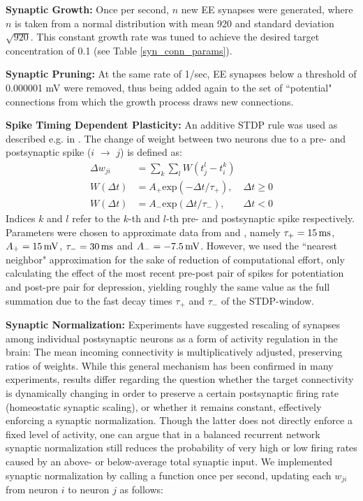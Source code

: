 \documentclass[10pt,a4paper]{article}
\begin{document}
\textbf{Synaptic Growth:} Once per second, $n$ new EE synapses were generated, where $n$ is taken from a normal distribution with mean 920 and standard deviation $\sqrt{920}$. This constant growth rate was tuned to achieve the desired target concentration of 0.1 (see Table \ref{syn_conn_params}).

\textbf{Synaptic Pruning:} At the same rate of 1/sec, EE synapses below a threshold of 0.000001 mV were removed, thus being added again to the set of ``potential" connections from which the growth process draws new connections.

\textbf{Spike Timing Dependent Plasticity:} An additive STDP rule was used as described e.g. in \cite{Zhang_STDP}. The change of weight between two neurons due to a pre- and postsynaptic spike ($i$ $\rightarrow$ $j$) is defined as:
\begin{align}
\Delta w_{ji} &= \sum_k \sum_l W(t_j^l - t_i^k) \label{STDP_rule} \\
W(\Delta t) &= A_{+} \mathrm{exp}(-\Delta t / \tau_{+}), & \Delta t \geq 0 \label{STDP_pos} \\
W(\Delta t) &= A_{-} \mathrm{exp}(\Delta t / \tau_{-}), & \Delta t < 0 \label{STDP_neg}
\end{align}
Indices $k$ and $l$ refer to the $k$-th and $l$-th pre- and postsynaptic spike respectively. Parameters were chosen to approximate data from \cite{Bi_Poo_STDP} and \cite{Froemke_STDP}, namely $\tau_{+} = \rm 15\, ms$, $A_{+} =\rm 15\, mV$, $\tau_{-} =\rm 30\, ms$ and $A_{-} =\rm -7.5\, mV$. However, we used the ``nearest neighbor" approximation for the sake of reduction of computational effort, only calculating the effect of the most recent pre-post pair of spikes for potentiation and post-pre pair for depression, yielding roughly the same value as the full summation due to the fast decay times $\tau_{+}$ and $\tau_{-}$ of the STDP-window.

\textbf{Synaptic Normalization:} Experiments have suggested rescaling of synapses among individual postsynaptic neurons as a form of activity regulation in the brain: The mean incoming connectivity is multiplicatively adjusted, preserving ratios of weights. While this general mechanism has been confirmed in many experiments, results differ regarding the question whether the target connectivity is dynamically changing in order to preserve a certain postsynaptic firing rate (homeostatic synaptic scaling), or whether it remains constant, effectively enforcing a synaptic normalization. Though the latter does not directly enforce a fixed level of activity, one can argue that in a balanced recurrent network synaptic normalization still reduces the probability of very high or low firing rates caused by an above- or below-average total synaptic input. We implemented synaptic normalization by calling a function once per second, updating each $w_{ji}$ from neuron $i$ to neuron $j$ as follows:
\end{document}
